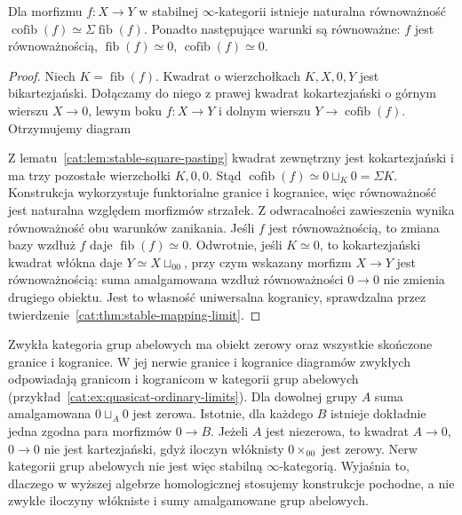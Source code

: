 \begin{wniosek}\label{cat:cor:stable-fiber-cofiber-shift}
Dla morfizmu $f:X\to Y$ w stabilnej $\infty$-kategorii istnieje naturalna równoważność $\operatorname{cofib}(f)\simeq\Sigma\operatorname{fib}(f)$. Ponadto następujące warunki są równoważne: $f$ jest równoważnością, $\operatorname{fib}(f)\simeq0$, $\operatorname{cofib}(f)\simeq0$.
\end{wniosek}
\begin{proof}
Niech $K=\operatorname{fib}(f)$. Kwadrat o wierzchołkach $K,X,0,Y$ jest bikartezjański. Dołączamy do niego z prawej kwadrat kokartezjański o górnym wierszu $X\to0$, lewym boku $f:X\to Y$ i dolnym wierszu $Y\to\operatorname{cofib}(f)$. Otrzymujemy diagram
\begin{center}
\end{center} Z lematu~\ref{cat:lem:stable-square-pasting} kwadrat zewnętrzny jest kokartezjański i ma trzy pozostałe wierzchołki $K,0,0$. Stąd $\operatorname{cofib}(f)\simeq0\sqcup_K0=\Sigma K$. Konstrukcja wykorzystuje funktorialne granice i kogranice, więc równoważność jest naturalna względem morfizmów strzałek. Z odwracalności zawieszenia wynika równoważność obu warunków zanikania. Jeśli $f$ jest równoważnością, to zmiana bazy wzdłuż $f$ daje $\operatorname{fib}(f)\simeq0$. Odwrotnie, jeśli $K\simeq0$, to kokartezjański kwadrat włókna daje $Y\simeq X\sqcup_00$, przy czym wskazany morfizm $X\to Y$ jest równoważnością: suma amalgamowana wzdłuż równoważności $0\to0$ nie zmienia drugiego obiektu. Jest to własność uniwersalna kogranicy, sprawdzalna przez twierdzenie~\ref{cat:thm:stable-mapping-limit}.
\end{proof}

\begin{przyklad}\label{cat:ex:stable-pointed-counterexample}
Zwykła kategoria grup abelowych ma obiekt zerowy oraz wszystkie skończone granice i kogranice. W jej nerwie granice i kogranice diagramów zwykłych odpowiadają granicom i kogranicom w kategorii grup abelowych (przykład~\ref{cat:ex:quasicat-ordinary-limits}). Dla dowolnej grupy $A$ suma amalgamowana $0\sqcup_A0$ jest zerowa. Istotnie, dla każdego $B$ istnieje dokładnie jedna zgodna para morfizmów $0\to B$. Jeżeli $A$ jest niezerowa, to kwadrat $A\to0$, $0\to0$ nie jest kartezjański, gdyż iloczyn włóknisty $0\times_00$ jest zerowy. Nerw kategorii grup abelowych nie jest więc stabilną $\infty$-kategorią. Wyjaśnia to, dlaczego w wyższej algebrze homologicznej stosujemy konstrukcje pochodne, a nie zwykłe iloczyny włókniste i sumy amalgamowane grup abelowych.
\end{przyklad}


